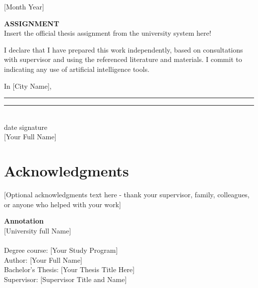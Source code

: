 \documentclass[11pt,a4paper,oneside]{book}
\newcommand{\thesistitle}{[Your Thesis Title Here]}
\newcommand{\authorname}{[Your Full Name]}
\newcommand{\studyprogram}{[Your Study Program]}
\newcommand{\universityName}{[University full Name]}
\newcommand{\facultName}{[Faculty full Name]}
\newcommand{\city}{[City Name]}
\newcommand{\supervisor}{[Supervisor Title and Name]}
\newcommand{\submissiondate}{[Month Year]}
\begin{document}
\vfill

{\large \submissiondate}\\[0.5cm]
\newpage
\thispagestyle{empty}
\mbox{}

\newpage
\thispagestyle{empty}
\begin{center}
    \vspace*{3cm}
    {\Large \textbf{ASSIGNMENT}}\\[2cm]
    
    {\large Insert the official thesis assignment from the university system here!}\\[1cm]
    
\end{center}

\newpage
\thispagestyle{empty}
\mbox{}

\newpage
\thispagestyle{empty}
\vspace*{5cm}

I declare that I have prepared this work independently, based on consultations with supervisor and using the referenced literature and materials. I commit to indicating any use of artificial intelligence tools.

\vspace{3cm}

In \city, \rule{3cm}{0.4pt} \hfill \rule{4cm}{0.4pt}\\
\phantom{In [City], }date \hfill signature\\[0.5cm]
\hfill \authorname

\newpage
\thispagestyle{empty}
\mbox{}

\newpage
\thispagestyle{empty}
\vspace*{3cm}
\section*{Acknowledgments}

[Optional acknowledgments text here - thank your supervisor, family, colleagues, or anyone who helped with your work]

\newpage
\thispagestyle{empty}
\mbox{}

\newpage
\thispagestyle{empty}

\begin{flushleft}
{\large \textbf{Annotation}}\\[0.25cm]

\universityName\\
\facultName\\[0.5cm]

Degree course: \studyprogram\\
Author: \authorname\\
Bachelor's Thesis: \thesistitle\\
Supervisor: \supervisor\\
\submissiondate\\[1cm]
\end{flushleft}
\end{document}
